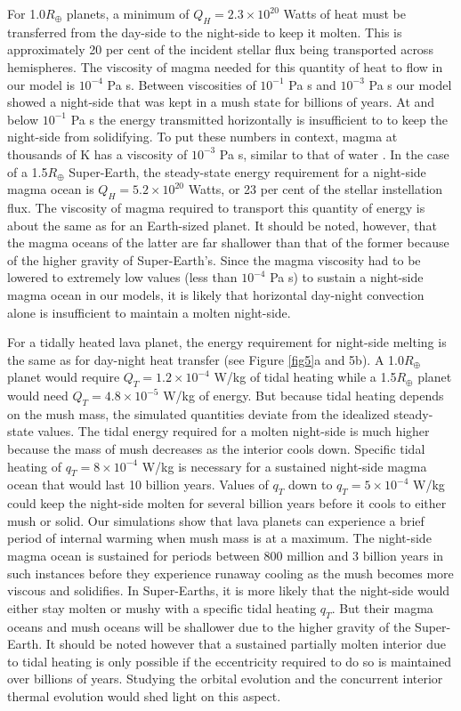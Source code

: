 \documentclass[fleqn,usenatbib]{mnras}
\begin{document}
For 1.0$R_{\oplus}$ planets, a minimum of $Q_{H} = 2.3 \times 10^{20}$ Watts of heat must be transferred from the day-side to the night-side to keep it molten. This is approximately 20 per cent of the incident stellar flux being transported across hemispheres. The viscosity of magma needed for this quantity of heat to flow in our model is $10^{-4}$ Pa s. Between viscosities of $10^{-1}$ Pa s and $10^{-3}$ Pa s our model showed a night-side that was kept in a mush state for billions of years. At and below $10^{-1}$ Pa s the energy transmitted horizontally is insufficient to to keep the night-side from solidifying. To put these numbers in context, magma at thousands of K has a viscosity of $10^{-3}$ Pa s, similar to that of water \citep{Malosso2022}. In the case of a 1.5$R_{\oplus}$ Super-Earth, the steady-state energy requirement for a night-side magma ocean is $Q_{H} = 5.2 \times 10^{20}$ Watts, or 23 per cent of the stellar instellation flux. The viscosity of magma required to transport this quantity of energy is about the same as for an Earth-sized planet. It should be noted, however, that the magma oceans of the latter are far shallower than that of the former because of the higher gravity of Super-Earth's. Since the magma viscosity had to be lowered to extremely low values (less than $10^{-4}$ Pa s) to sustain a night-side magma ocean in our models, it is likely that horizontal day-night convection alone is insufficient to maintain a molten night-side. 

For a tidally heated lava planet, the energy requirement for night-side melting is the same as for day-night heat transfer (see Figure \ref{fig5}a and 5b). A 1.0$R_{\oplus}$ planet would require $Q_{T} = 1.2 \times 10^{-4}$ W/kg of tidal heating while a 1.5$R_{\oplus}$ planet would need $Q_{T} = 4.8 \times 10^{-5}$ W/kg of energy. But because tidal heating depends on the mush mass, the simulated quantities deviate from the idealized steady-state values. The tidal energy required for a molten night-side is much higher because the mass of mush decreases as the interior cools down. Specific tidal heating of $q_{T} = 8 \times 10^{-4}$ W/kg is necessary for a sustained night-side magma ocean that would last 10 billion years. Values of $q_{T}$ down to $q_{T} = 5 \times 10^{-4}$ W/kg could keep the night-side molten for several billion years before it cools to either mush or solid. Our simulations show that lava planets can experience a brief period of internal warming when mush mass is at a maximum. The night-side magma ocean is sustained for periods between 800 million and 3 billion years in such instances before they experience runaway cooling as the mush becomes more viscous and solidifies. In Super-Earths, it is more likely that the night-side would either stay molten or mushy with a specific tidal heating $q_{T}$. But their magma oceans and mush oceans will be shallower due to the higher gravity of the Super-Earth. It should be noted however that a sustained partially molten interior due to tidal heating is only possible if the eccentricity required to do so is maintained over billions of years. Studying the orbital evolution and the concurrent interior thermal evolution would shed light on this aspect. 
\end{document}
